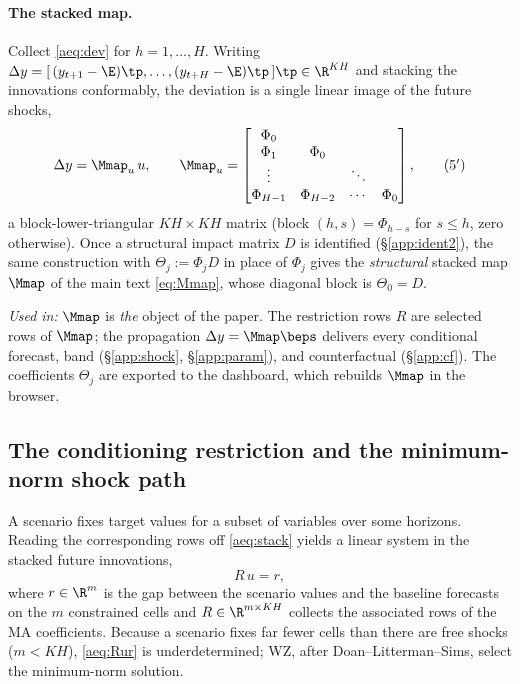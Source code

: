 \paragraph{The stacked map.} Collect \eqref{aeq:dev} for $h=1,\dots,H$. Writing
$\Delta y=[\,(y_{t+1}-\E)\tp,\dots,(y_{t+H}-\E)\tp\,]\tp\in\R^{KH}$ and stacking
the innovations conformably, the deviation is a single linear image of the future
shocks,
\begin{equation}
\Delta y=\Mmap_u\,u,\qquad
\Mmap_u=\begin{bmatrix}
\Phi_0 & & &\\
\Phi_1 & \Phi_0 & &\\
\vdots & & \ddots &\\
\Phi_{H-1} & \Phi_{H-2} & \cdots & \Phi_0
\end{bmatrix},
\tag{5$'$}\label{aeq:stack}
\end{equation}
a block-lower-triangular $KH\times KH$ matrix (block $(h,s)=\Phi_{h-s}$ for
$s\le h$, zero otherwise). Once a structural impact matrix $D$ is identified
(\S\ref{app:ident2}), the same construction with $\Theta_j:=\Phi_jD$ in place of
$\Phi_j$ gives the \emph{structural} stacked map $\Mmap$ of the main text
\eqref{eq:Mmap}, whose diagonal block is $\Theta_0=D$.

\medskip
\noindent\textit{Used in:} $\Mmap$ is \emph{the} object of the paper. The
restriction rows $R$ are selected rows of $\Mmap$; the propagation
$\Delta y=\Mmap\beps$ delivers every conditional forecast, band
(\S\ref{app:shock}, \S\ref{app:param}), and counterfactual (\S\ref{app:cf}). The
coefficients $\Theta_j$ are exported to the dashboard, which rebuilds $\Mmap$ in
the browser.

\subsection{The conditioning restriction and the minimum-norm shock path}\label{app:minnorm}
A scenario fixes target values for a subset of variables over some horizons.
Reading the corresponding rows off \eqref{aeq:stack} yields a linear system in the
stacked future innovations,
\begin{equation}
R\,u=r,
\tag{5$''$}\label{aeq:Rur}
\end{equation}
where $r\in\R^{m}$ is the gap between the scenario values and the baseline
forecasts on the $m$ constrained cells and $R\in\R^{m\times KH}$ collects the
associated rows of the MA coefficients. Because a scenario fixes far fewer cells
than there are free shocks ($m<KH$), \eqref{aeq:Rur} is underdetermined; WZ, after
Doan--Litterman--Sims, select the minimum-norm solution.

